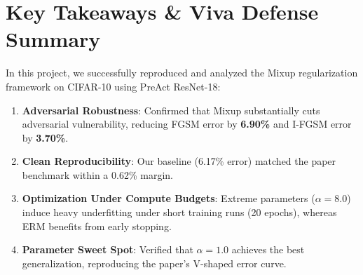 \documentclass[conference]{IEEEtran}
\begin{document}
\section{Key Takeaways \& Viva Defense Summary}

In this project, we successfully reproduced and analyzed the Mixup regularization framework on CIFAR-10 using PreAct ResNet-18:
\begin{enumerate}
    \item \textbf{Adversarial Robustness}: Confirmed that Mixup substantially cuts adversarial vulnerability, reducing FGSM error by \textbf{6.90\%} and I-FGSM error by \textbf{3.70\%}.
    \item \textbf{Clean Reproducibility}: Our baseline (6.17\% error) matched the paper benchmark within a 0.62\% margin.
    \item \textbf{Optimization Under Compute Budgets}: Extreme parameters ($\alpha=8.0$) induce heavy underfitting under short training runs (20 epochs), whereas ERM benefits from early stopping.
    \item \textbf{Parameter Sweet Spot}: Verified that $\alpha = 1.0$ achieves the best generalization, reproducing the paper's V-shaped error curve.
\end{enumerate}
\end{document}
